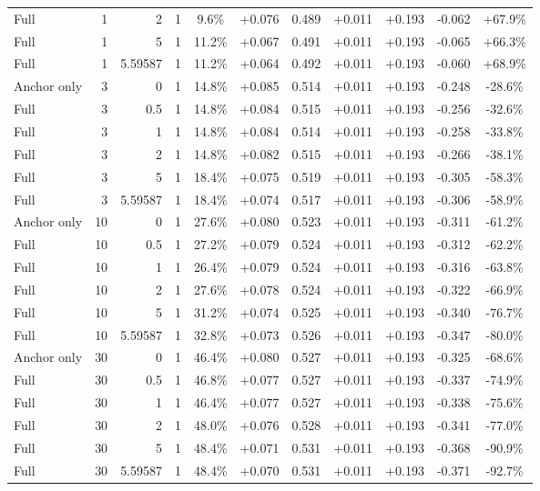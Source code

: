\begin{table}[htbp]
\begin{tabular}{lrrrccccccc}
Full & 1 & 2 & 1 & 9.6\% & +0.076 & 0.489 & +0.011 & +0.193 & -0.062 & +67.9\% \\
Full & 1 & 5 & 1 & 11.2\% & +0.067 & 0.491 & +0.011 & +0.193 & -0.065 & +66.3\% \\
Full & 1 & 5.59587 & 1 & 11.2\% & +0.064 & 0.492 & +0.011 & +0.193 & -0.060 & +68.9\% \\
Anchor only & 3 & 0 & 1 & 14.8\% & +0.085 & 0.514 & +0.011 & +0.193 & -0.248 & -28.6\% \\
Full & 3 & 0.5 & 1 & 14.8\% & +0.084 & 0.515 & +0.011 & +0.193 & -0.256 & -32.6\% \\
Full & 3 & 1 & 1 & 14.8\% & +0.084 & 0.514 & +0.011 & +0.193 & -0.258 & -33.8\% \\
Full & 3 & 2 & 1 & 14.8\% & +0.082 & 0.515 & +0.011 & +0.193 & -0.266 & -38.1\% \\
Full & 3 & 5 & 1 & 18.4\% & +0.075 & 0.519 & +0.011 & +0.193 & -0.305 & -58.3\% \\
Full & 3 & 5.59587 & 1 & 18.4\% & +0.074 & 0.517 & +0.011 & +0.193 & -0.306 & -58.9\% \\
Anchor only & 10 & 0 & 1 & 27.6\% & +0.080 & 0.523 & +0.011 & +0.193 & -0.311 & -61.2\% \\
Full & 10 & 0.5 & 1 & 27.2\% & +0.079 & 0.524 & +0.011 & +0.193 & -0.312 & -62.2\% \\
Full & 10 & 1 & 1 & 26.4\% & +0.079 & 0.524 & +0.011 & +0.193 & -0.316 & -63.8\% \\
Full & 10 & 2 & 1 & 27.6\% & +0.078 & 0.524 & +0.011 & +0.193 & -0.322 & -66.9\% \\
Full & 10 & 5 & 1 & 31.2\% & +0.074 & 0.525 & +0.011 & +0.193 & -0.340 & -76.7\% \\
Full & 10 & 5.59587 & 1 & 32.8\% & +0.073 & 0.526 & +0.011 & +0.193 & -0.347 & -80.0\% \\
Anchor only & 30 & 0 & 1 & 46.4\% & +0.080 & 0.527 & +0.011 & +0.193 & -0.325 & -68.6\% \\
Full & 30 & 0.5 & 1 & 46.8\% & +0.077 & 0.527 & +0.011 & +0.193 & -0.337 & -74.9\% \\
Full & 30 & 1 & 1 & 46.4\% & +0.077 & 0.527 & +0.011 & +0.193 & -0.338 & -75.6\% \\
Full & 30 & 2 & 1 & 48.0\% & +0.076 & 0.528 & +0.011 & +0.193 & -0.341 & -77.0\% \\
Full & 30 & 5 & 1 & 48.4\% & +0.071 & 0.531 & +0.011 & +0.193 & -0.368 & -90.9\% \\
Full & 30 & 5.59587 & 1 & 48.4\% & +0.070 & 0.531 & +0.011 & +0.193 & -0.371 & -92.7\% \\

\end{tabular}
\end{table}
